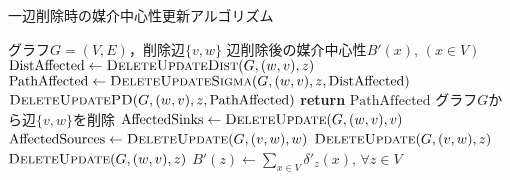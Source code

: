 \begin{algorithm}[H]
  \caption{一辺削除時の媒介中心性更新アルゴリズム}
  \label{algo:update-bc-on-delete}
  \begin{algorithmic}[1]
    \Require グラフ$G=(V,E)$，削除辺$\{v,w\}$
    \Ensure 辺削除後の媒介中心性$B'(x),\,(x\in V)$
    \State $\mathrm{DistAffected}\gets\textproc{DeleteUpdateDist}(G,(w,v),z)$
    \State $\mathrm{PathAffected}\gets\textproc{DeleteUpdateSigma}(G,(w,v),z,\mathrm{DistAffected})$
    \State $\textproc{DeleteUpdatePD}(G,(w,v),z,\mathrm{PathAffected})$
    \State \textbf{return} $\mathrm{PathAffected}$
    \EndProcedure
    \State グラフ$G$から辺$\{v,w\}$を削除
    \State $\mathrm{AffectedSinks}\gets\textproc{DeleteUpdate}(G,(w,v),v)$
    \State $\mathrm{AffectedSources}\gets\textproc{DeleteUpdate}(G,(v,w),w)$
    \State $\textproc{DeleteUpdate}(G,(v,w),z)$
    \EndFor
    \State $\textproc{DeleteUpdate}(G,(w,v),z)$
    \EndFor
    \State $B'(z)\gets\sum_{x\in V}\delta'_z(x),\,\forall z\in V$
  \end{algorithmic}
\end{algorithm}
